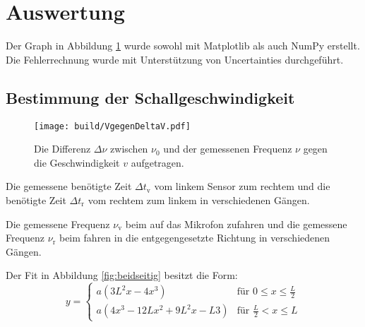 
\section{Auswertung}
\label{sec:Auswertung}

Der Graph in Abbildung \ref{fig:Graph1} wurde sowohl mit Matplotlib \cite{matplotlib} als auch NumPy \cite{numpy} erstellt.
  Die Fehlerrechnung wurde mit Unterstützung von Uncertainties \cite{uncertainties}
	 durchgeführt.

\subsection{Bestimmung der Schallgeschwindigkeit}
\begin{figure}
	\centering
	\caption{Die Differenz $\Delta \nu $ zwischen $\nu_0$ und der gemessenen Frequenz $\nu$ gegen die Geschwindigkeit $v$ aufgetragen.}
	\texttt{[image: build/VgegenDeltaV.pdf]}
	\label{fig:Graph1}
\end{figure}
\begin{table}
	\caption{Die gemessene benötigte Zeit $\Delta t_\text{v}$ vom linkem Sensor zum rechtem und die benötigte Zeit $\Delta t_\text{r}$ vom rechtem zum linkem in verschiedenen Gängen.}
	\begin{minipage}{0.5\textwidth}
		\centering
		
	\end{minipage}
	\begin{minipage}{0.5\textwidth}
		\centering
		
	\end{minipage}
\end{table}
\begin{table}
	\caption{Die gemessene Frequenz $\nu_\text{v}$ beim auf das Mikrofon zufahren und die gemessene Frequenz $\nu_\text{r}$ beim fahren in die entgegengesetzte Richtung in verschiedenen Gängen.}
	\begin{minipage}{0.5\textwidth}
		\centering
		
	\end{minipage}
	\begin{minipage}{0.5\textwidth}
		\centering
		
	\end{minipage}
\end{table}
Der Fit in Abbildung \ref{fig:beidseitig} besitzt die Form:
\begin{equation}
	y =
	\begin{cases}
	a\left(3L^2 x-4x^3\right)& \text{für }0\leq x \leq \frac{L}{2} \\
	a\left(4 x^3 -12 L x^2 + 9 L^2 x -L 3 \right)& \text{für }\frac{L}{2} < x \leq L
	\end{cases} \label{FunktionBeidseitig}
\end{equation}
